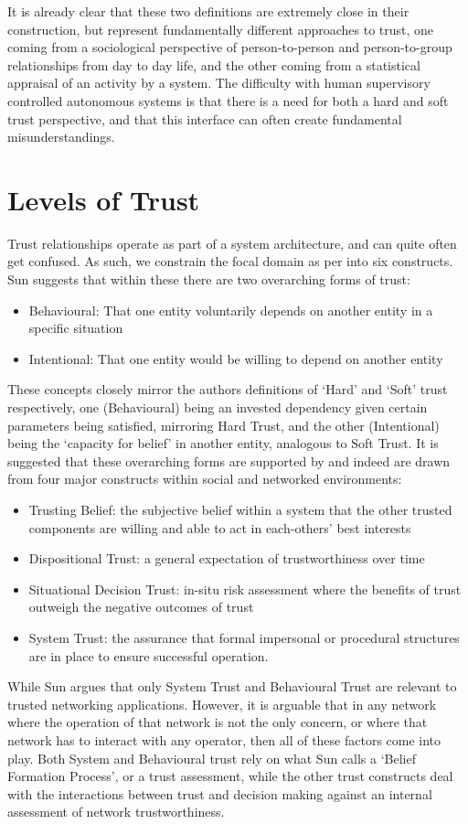 It is already clear that these two definitions are extremely close in their construction, but represent fundamentally different approaches to trust, one coming from a sociological perspective of person-to-person and person-to-group relationships from day to day life, and the other coming from a statistical appraisal of an activity by a system. The difficulty with human supervisory controlled autonomous systems is that there is a need for both a hard and soft trust perspective, and that this interface can often create fundamental misunderstandings.


\section{Levels of Trust}
Trust relationships operate as part of a system architecture, and can quite often get confused.
As such, we constrain the focal domain as per \cite{Liu2006} into six constructs. Sun\cite{Sun2008} suggests that within these there are two overarching forms of trust:
\begin{itemize}
\item Behavioural: That one entity voluntarily depends on another entity in a specific situation
\item Intentional: That one entity would be willing to depend on another entity
\end{itemize}

These concepts closely mirror the authors definitions of ‘Hard’ and ‘Soft’ trust respectively, one (Behavioural) being an invested dependency given certain parameters being satisfied, mirroring Hard Trust, and the other (Intentional) being the ‘capacity for belief’ in another entity, analogous to Soft Trust.
It is suggested that these overarching forms are supported by and indeed are drawn from four major constructs within social and networked environments:
\begin{itemize}
	\item Trusting Belief: the subjective belief within a system that the other trusted components are willing and able to act in each-others’ best interests
	\item Dispositional Trust: a general expectation of trustworthiness over time 
	\item Situational Decision Trust: in-situ risk assessment where the benefits of trust outweigh the negative outcomes of trust
	\item System Trust: the assurance that formal impersonal or procedural structures are in place to ensure successful operation.
\end{itemize}
While Sun argues that only System Trust and Behavioural Trust are relevant to trusted networking applications. However, it is arguable that in any network where the operation of that network is not the only concern, or where that network has to interact with any operator, then all of these factors come into play.
Both System and Behavioural trust rely on what Sun calls a ‘Belief Formation Process’, or a trust assessment, while the other trust constructs deal with the interactions between trust and decision making against an internal assessment of network trustworthiness.

